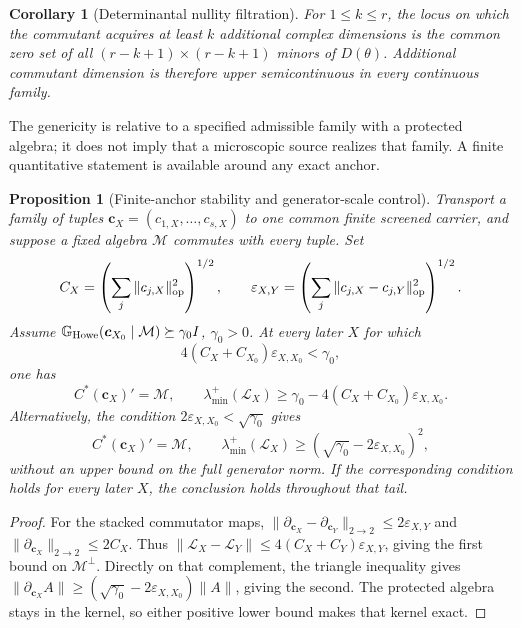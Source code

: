 \documentclass[11pt]{article}
\numberwithin{equation}{section}
\newtheorem{proposition}[theorem]{Proposition}
\newtheorem{corollary}[theorem]{Corollary}
\theoremstyle{definition}
\theoremstyle{remark}
\newcommand{\M}{\mathcal M}
\begin{document}
\begin{corollary}[Determinantal nullity filtration]
\label{cor:howe-nullity}
For $1\le k\le r$, the locus on which the commutant acquires at least $k$
additional complex dimensions is the common zero set of all
$(r-k+1)\times(r-k+1)$ minors of $D(\theta)$.  Additional commutant dimension
is therefore upper semicontinuous in every continuous family.
\end{corollary}

The genericity is relative to a specified admissible family with a protected
algebra; it does not imply that a microscopic source realizes that family.
A finite quantitative statement is available around any exact anchor.

\begin{proposition}[Finite-anchor stability and generator-scale control]
\label{thm:finite-anchor}
Transport a family of tuples $\bm c_X=(c_{1,X},\ldots,c_{s,X})$ to one
common finite screened carrier, and suppose a fixed algebra $\M$ commutes
with every tuple.  Set
\[
 C_X=\left(\sum_j\|c_{j,X}\|_{\rm op}^2\right)^{1/2},\qquad
 \varepsilon_{X,Y}=\left(\sum_j\|c_{j,X}-c_{j,Y}\|_{\rm op}^2\right)^{1/2}.
\]
Assume $\mathbb G_{\rm Howe}(\bm c_{X_0}\mid\M)\succeq\gamma_0I$,
$\gamma_0>0$.  At every later $X$ for which
\begin{equation}
 4(C_X+C_{X_0})\varepsilon_{X,X_0}<\gamma_0,
 \label{eq:anchor-tail}
\end{equation}
one has
\begin{equation}
 C^*(\bm c_X)'=\M,\qquad
 \lambda_{\min}^+(\mathscr L_X)
 \ge\gamma_0-4(C_X+C_{X_0})\varepsilon_{X,X_0}.
 \label{eq:anchor-lock}
\end{equation}
Alternatively, the condition
$2\varepsilon_{X,X_0}<\sqrt{\gamma_0}$ gives
\begin{equation}
 C^*(\bm c_X)'=\M,\qquad
 \lambda_{\min}^+(\mathscr L_X)
 \ge(\sqrt{\gamma_0}-2\varepsilon_{X,X_0})^2,
 \label{eq:generator-scale-gap}
\end{equation}
without an upper bound on the full generator norm.  If the corresponding
condition holds for every later $X$, the conclusion holds throughout that tail.
\end{proposition}
\begin{proof}
For the stacked commutator maps,
$\|\partial_{\bm c_X}-\partial_{\bm c_Y}\|_{2\to2}\le2\varepsilon_{X,Y}$
and $\|\partial_{\bm c_X}\|_{2\to2}\le2C_X$.
Thus $\|\mathscr L_X-\mathscr L_Y\|\le
4(C_X+C_Y)\varepsilon_{X,Y}$, giving the first bound on $\M^\perp$.
Directly on that complement, the triangle inequality gives
$\|\partial_{\bm c_X}A\|\ge
(\sqrt{\gamma_0}-2\varepsilon_{X,X_0})\|A\|$, giving the second.
The protected algebra stays in the kernel, so either positive lower bound
makes that kernel exact.
\end{proof}
\end{document}
